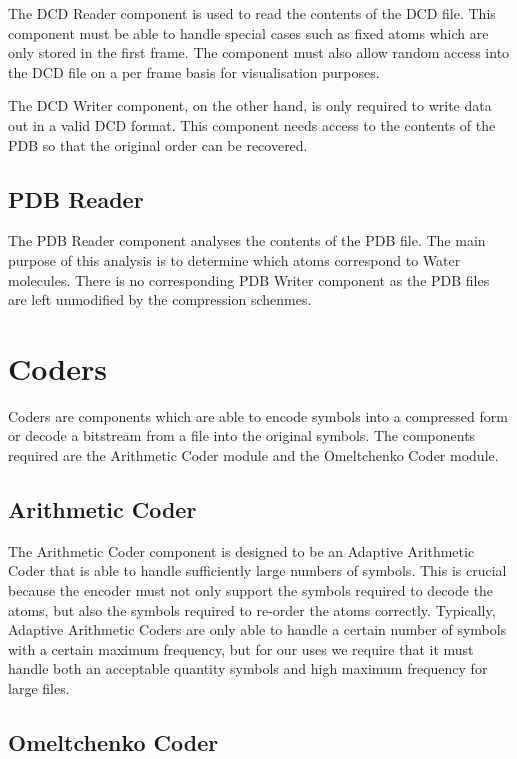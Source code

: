 \documentclass[a4paper,11pt]{report}
\begin{document}
The DCD Reader component is used to read the contents of the DCD file. This component must be able to handle special cases such as fixed atoms which are only stored in the first frame. The component must also allow random access into the DCD file on a per frame basis for visualisation purposes.

The DCD Writer component, on the other hand, is only required to write data out in a valid DCD format. This component needs access to the contents of the PDB so that the original order can be recovered.

\subsection{PDB Reader}

The PDB Reader component analyses the contents of the PDB file. The main purpose of this analysis is to determine which atoms correspond to Water molecules. There is no corresponding PDB Writer component as the PDB files are left unmodified by the compression schenmes. 

\section{Coders}

Coders are components which are able to encode symbols into a compressed form or decode a bitstream from a file into the original symbols. The components required are the Arithmetic Coder module and the Omeltchenko Coder module.

\subsection{Arithmetic Coder}

The Arithmetic Coder component is designed to be an Adaptive Arithmetic Coder that is able to handle sufficiently large numbers of symbols. This is crucial because the encoder must not only support the symbols required to decode the atoms, but also the symbols required to re-order the atoms correctly. Typically, Adaptive Arithmetic Coders are only able to handle a certain number of symbols with a certain maximum frequency, but for our uses we require that it must handle both an acceptable quantity symbols and high maximum frequency for large files.

\subsection{Omeltchenko Coder}
\end{document}
